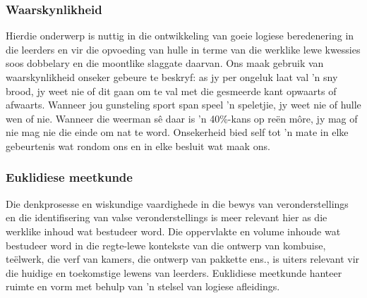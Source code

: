 \subsubsection{Waarskynlikheid}
Hierdie onderwerp is nuttig in die ontwikkeling van goeie logiese beredenering in die leerders en vir die opvoeding van hulle in terme van die werklike lewe kwessies soos dobbelary en die moontlike slaggate daarvan. Ons maak gebruik van waarskynlikheid onseker gebeure te beskryf: as jy per ongeluk laat val 'n sny brood, jy weet nie of dit gaan om te val met die gesmeerde kant opwaarts of afwaarts. Wanneer jou gunsteling sport span speel 'n speletjie, jy weet nie of hulle wen of nie. Wanneer die weerman s\^{e} daar is 'n 40\%-kans op re\"{e}n m\^{o}re, jy mag of nie mag nie die einde om nat te word. Onsekerheid bied self tot 'n mate in elke gebeurtenis wat rondom ons en in elke besluit wat maak ons.

\subsubsection{Euklidiese meetkunde}
Die denkprosesse en wiskundige vaardighede in die bewys van veronderstellings en die identifisering van valse veronderstellings is meer relevant hier as die werklike inhoud wat bestudeer word. Die oppervlakte en volume inhoude wat bestudeer word in die regte-lewe kontekste van die ontwerp van kombuise, teëlwerk, die verf van kamers, die ontwerp van pakkette ens., is uiters relevant vir die huidige en toekomstige lewens van leerders. Euklidiese meetkunde hanteer ruimte en vorm met behulp van 'n stelsel van logiese afleidings.

